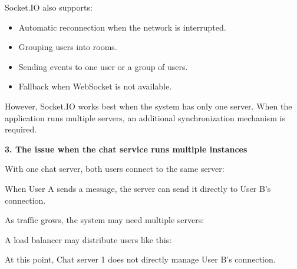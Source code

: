 Socket.IO also supports:

\begin{itemize}
\tightlist
\item
  Automatic reconnection when the network is interrupted.
\item
  Grouping users into rooms.
\item
  Sending events to one user or a group of users.
\item
  Fallback when WebSocket is not available.
\end{itemize}

However, Socket.IO works best when the system has only one server. When
the application runs multiple servers, an additional synchronization
mechanism is required.

\vspace{0.5em}\noindent\textbf{3. The issue when the chat service runs multiple
instances}\par

With one chat server, both users connect to the same server:

\begin{Shaded}
\begin{Highlighting}[]
\end{Highlighting}
\end{Shaded}

When User A sends a message, the server can send it directly to User B's
connection.

As traffic grows, the system may need multiple servers:

\begin{Shaded}
\begin{Highlighting}[]
\end{Highlighting}
\end{Shaded}

A load balancer may distribute users like this:

\begin{Shaded}
\begin{Highlighting}[]
\end{Highlighting}
\end{Shaded}

At this point, Chat server 1 does not directly manage User B's
connection.

